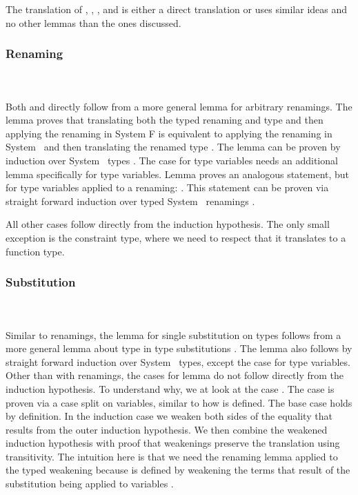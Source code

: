 \noindent The translation of , , ,  and  is either a direct translation or uses similar ideas and no other lemmas than the ones discussed.

\subsubsection{Renaming}\hfill\\\\
Both  and  directly follow from a more general lemma  for arbitrary renamings. 
The lemma  proves that translating both the typed renaming  and type  and then applying the renaming in System F is equivalent to applying the renaming  in System \Fo\ and then translating the renamed type . 
The lemma can be proven by induction over System \Fo\ types .
\newpage
\DPTTypePresRen
The case for type variables needs an additional lemma  specifically for type variables.
Lemma  proves an analogous statement, but for type variables applied to a renaming: \DPTVarPresRen. 
This statement can be proven via straight forward induction over typed System \Fo\ renamings .

\noindent All other cases follow directly from the induction hypothesis. 
The only small exception is the constraint type, where we need to respect that it translates to a function type.

\subsubsection{Substitution}\hfill\\\\
Similar to renamings, the lemma for single substitution on types  follows from a more general lemma about type in type substitutions .
The lemma  also follows by straight forward induction over System \Fo\ types, except the case for type variables. 
Other than with renamings, the cases for lemma  do not follow directly from the induction hypothesis. 
To understand why, we at look at the case .
\DPTVarPresSub
The case  is proven via a case split on variables, similar to how  is defined. 
The base case holds by definition. 
In the induction case we weaken both sides of the equality that results from the outer induction hypothesis. 
We then combine the weakened induction hypothesis with proof that weakenings preserve the translation using transitivity. 
The intuition here is that we need the renaming lemma  applied to the typed weakening  because  is defined by weakening the terms that result of the substitution  being applied to variables .

